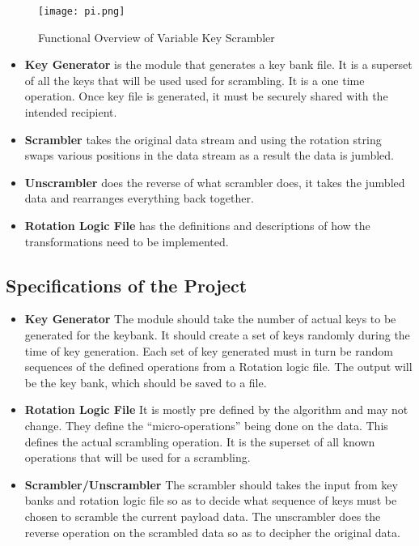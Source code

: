 \begin{figure}[h!]
  \centering
     \texttt{[image: pi.png]}
 \caption{Functional Overview of Variable Key Scrambler}
 \label{var_key_overview} %
\end{figure}

\begin{itemize}
  \item {\bf Key Generator} is the module that generates a key bank file. It is a superset of all the keys that will be used used for scrambling. It is a one time operation. Once key file is generated, it must be securely shared with the intended recipient.
  \item {\bf Scrambler} takes the original data stream and using the rotation string swaps various positions in the data stream as a result the data is jumbled.
  \item {\bf Unscrambler} does the reverse of what scrambler does, it takes the jumbled data and rearranges everything back together.
  \item  {\bf Rotation Logic File} has the definitions and descriptions of how the transformations need
to be implemented.
\end{itemize}

\subsection{Specifications of the Project}

\begin{itemize}
  \item {\bf Key Generator} The module should take the number of actual keys to be generated for the keybank. It should create a set of keys randomly during the time of key generation. Each set of key generated must in turn be random sequences of the defined operations from a Rotation logic file. The output will be the key bank, which should be saved to a file.

  \item {\bf Rotation Logic File} It is mostly pre defined by the algorithm and may not change. They define the “micro-operations” being done on the data. This defines the actual scrambling operation. It is the superset of all known operations that will be used for a scrambling.

  \item {\bf Scrambler/Unscrambler} The scrambler should takes the input from key banks and rotation logic file so as to decide what sequence of keys must be chosen to scramble the current payload data. The unscrambler does the reverse operation on the scrambled data so as to decipher the original data.

\end{itemize}


